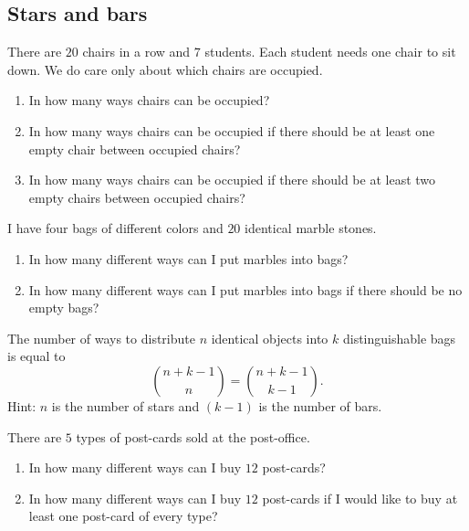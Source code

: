 \documentclass[12pt]{article}
\begin{document}
\subsection*{Stars and bars}

\begin{exercise}
There are $20$ chairs in a row and $7$ students. Each student needs one chair to sit down. 
We do care only about which chairs are occupied.

\begin{enumerate}[label=\alph*)]
    \item In how many ways chairs can be occupied? 
    \item In how many ways chairs can be occupied if there should be at least one empty chair between occupied chairs?
    \item In how many ways chairs can be occupied if there should be at least two empty chairs between occupied chairs?
\end{enumerate}
\end{exercise}

\begin{exercise}
I have four bags of different colors and $20$ identical marble stones. 

\begin{enumerate}[label=\alph*)]
    \item In how many different ways can I put marbles into bags?
    \item In how many different ways can I put marbles into bags if there should be no empty bags?
\end{enumerate}
\end{exercise}

\begin{theorem}
The number of ways to distribute $n$ identical objects into $k$ distinguishable bags is equal to
\[
{n + k - 1 \choose n} = {n + k - 1 \choose k - 1}.
\]
Hint: $n$ is the number of stars and $(k - 1)$ is the number of bars. 
\end{theorem}

\begin{exercise}
There are $5$ types of post-cards sold at the post-office. 
\begin{enumerate}[label=\alph*)]
\item In how many different ways can I buy $12$ post-cards?
\item In how many different ways can I buy $12$ post-cards if I would like to buy at least one post-card of every type?
\end{enumerate}
\end{exercise}
\end{document}
